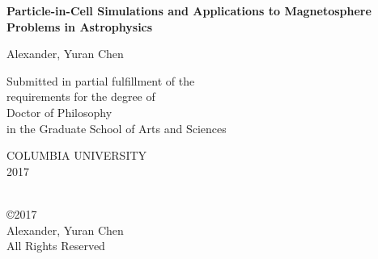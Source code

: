 
\newcommand{\thesistitle}{Particle-in-Cell Simulations and Applications
 \protect\linebreak[1]to Magnetosphere Problems in Astrophysics}
\newcommand{\thesisauthor}{Alexander, Yuran Chen}
\newcommand{\thesisyear}{2017}


$\phantom{a}$

$\phantom{a}$

$\phantom{a}$

\begin{center}

{\LARGE \bf \thesistitle}

\vskip1.0in

{\Large  \thesisauthor} \vskip0.5in

\vskip1.5in

\large
Submitted in partial fulfillment of the \\
requirements for the degree of \\
Doctor of Philosophy \\
in the Graduate School of Arts and Sciences \\

\vskip0.5in

COLUMBIA UNIVERSITY \\
\thesisyear \\

\end{center}
\clearpage

\begin{center}
\ \\
\vskip6.5in
\copyright \thesisyear \\[3mm]
\thesisauthor \\
All Rights Reserved
\end{center}
\clearpage

